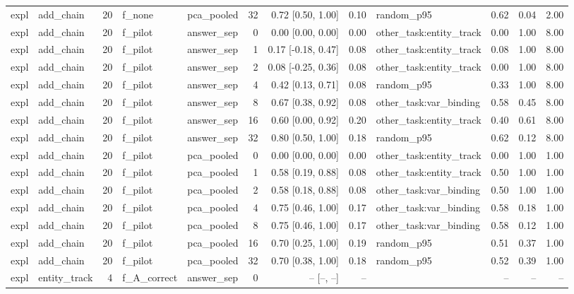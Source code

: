 \begin{tabular}{llrllrrrlrrr}
expl & add\_chain & 20 & f\_none & pca\_pooled & 32 & 0.72 [0.50, 1.00] & 0.10 & random\_p95 & 0.62 & 0.04 & 2.00 \\
expl & add\_chain & 20 & f\_pilot & answer\_sep & 0 & 0.00 [0.00, 0.00] & 0.00 & other\_task:entity\_track & 0.00 & 1.00 & 8.00 \\
expl & add\_chain & 20 & f\_pilot & answer\_sep & 1 & 0.17 [-0.18, 0.47] & 0.08 & other\_task:entity\_track & 0.08 & 1.00 & 8.00 \\
expl & add\_chain & 20 & f\_pilot & answer\_sep & 2 & 0.08 [-0.25, 0.36] & 0.08 & other\_task:entity\_track & 0.00 & 1.00 & 8.00 \\
expl & add\_chain & 20 & f\_pilot & answer\_sep & 4 & 0.42 [0.13, 0.71] & 0.08 & random\_p95 & 0.33 & 1.00 & 8.00 \\
expl & add\_chain & 20 & f\_pilot & answer\_sep & 8 & 0.67 [0.38, 0.92] & 0.08 & other\_task:var\_binding & 0.58 & 0.45 & 8.00 \\
expl & add\_chain & 20 & f\_pilot & answer\_sep & 16 & 0.60 [0.00, 0.92] & 0.20 & other\_task:entity\_track & 0.40 & 0.61 & 8.00 \\
expl & add\_chain & 20 & f\_pilot & answer\_sep & 32 & 0.80 [0.50, 1.00] & 0.18 & random\_p95 & 0.62 & 0.12 & 8.00 \\
expl & add\_chain & 20 & f\_pilot & pca\_pooled & 0 & 0.00 [0.00, 0.00] & 0.00 & other\_task:entity\_track & 0.00 & 1.00 & 1.00 \\
expl & add\_chain & 20 & f\_pilot & pca\_pooled & 1 & 0.58 [0.19, 0.88] & 0.08 & other\_task:entity\_track & 0.50 & 1.00 & 1.00 \\
expl & add\_chain & 20 & f\_pilot & pca\_pooled & 2 & 0.58 [0.18, 0.88] & 0.08 & other\_task:var\_binding & 0.50 & 1.00 & 1.00 \\
expl & add\_chain & 20 & f\_pilot & pca\_pooled & 4 & 0.75 [0.46, 1.00] & 0.17 & other\_task:var\_binding & 0.58 & 0.18 & 1.00 \\
expl & add\_chain & 20 & f\_pilot & pca\_pooled & 8 & 0.75 [0.46, 1.00] & 0.17 & other\_task:var\_binding & 0.58 & 0.12 & 1.00 \\
expl & add\_chain & 20 & f\_pilot & pca\_pooled & 16 & 0.70 [0.25, 1.00] & 0.19 & random\_p95 & 0.51 & 0.37 & 1.00 \\
expl & add\_chain & 20 & f\_pilot & pca\_pooled & 32 & 0.70 [0.38, 1.00] & 0.18 & random\_p95 & 0.52 & 0.39 & 1.00 \\
expl & entity\_track & 4 & f\_A\_correct & answer\_sep & 0 & -- [--, --] & -- &  & -- & -- & -- \\

\end{tabular}
